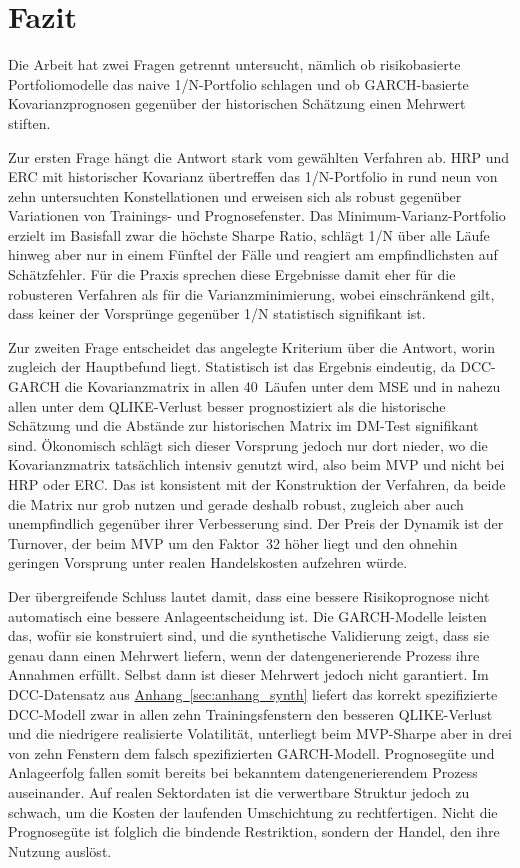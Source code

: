\documentclass[a4paper, 12pt]{article}
\begin{document}
\section{Fazit}\label{sec:fazit}
Die Arbeit hat zwei Fragen getrennt untersucht, nämlich ob risikobasierte Portfoliomodelle das naive 1/N-Portfolio schlagen und ob GARCH-basierte Kovarianzprognosen gegenüber der historischen Schätzung einen Mehrwert stiften.

Zur ersten Frage hängt die Antwort stark vom gewählten Verfahren ab.
HRP und ERC mit historischer Kovarianz übertreffen das 1/N-Portfolio in rund neun von zehn untersuchten Konstellationen und erweisen sich als robust gegenüber Variationen von Trainings- und Prognosefenster.
Das Minimum-Varianz-Portfolio erzielt im Basisfall zwar die höchste Sharpe Ratio, schlägt 1/N über alle Läufe hinweg aber nur in einem Fünftel der Fälle und reagiert am empfindlichsten auf Schätzfehler.
Für die Praxis sprechen diese Ergebnisse damit eher für die robusteren Verfahren als für die Varianzminimierung, wobei einschränkend gilt, dass keiner der Vorsprünge gegenüber 1/N statistisch signifikant ist.

Zur zweiten Frage entscheidet das angelegte Kriterium über die Antwort, worin zugleich der Hauptbefund liegt.
Statistisch ist das Ergebnis eindeutig, da DCC-GARCH die Kovarianzmatrix in allen 40~Läufen unter dem MSE und in nahezu allen unter dem QLIKE-Verlust besser prognostiziert als die historische Schätzung und die Abstände zur historischen Matrix im DM-Test signifikant sind.
Ökonomisch schlägt sich dieser Vorsprung jedoch nur dort nieder, wo die Kovarianzmatrix tatsächlich intensiv genutzt wird, also beim MVP und nicht bei HRP oder ERC.
Das ist konsistent mit der Konstruktion der Verfahren, da beide die Matrix nur grob nutzen und gerade deshalb robust, zugleich aber auch unempfindlich gegenüber ihrer Verbesserung sind.
Der Preis der Dynamik ist der Turnover, der beim MVP um den Faktor~32 höher liegt und den ohnehin geringen Vorsprung unter realen Handelskosten aufzehren würde.

Der übergreifende Schluss lautet damit, dass eine bessere Risikoprognose nicht automatisch eine bessere Anlageentscheidung ist.
Die GARCH-Modelle leisten das, wofür sie konstruiert sind, und die synthetische Validierung zeigt, dass sie genau dann einen Mehrwert liefern, wenn der datengenerierende Prozess ihre Annahmen erfüllt.
Selbst dann ist dieser Mehrwert jedoch nicht garantiert.
Im DCC-Datensatz aus \hyperref[sec:anhang_synth]{Anhang~\ref*{sec:anhang_synth}} liefert das korrekt spezifizierte DCC-Modell zwar in allen zehn Trainingsfenstern den besseren QLIKE-Verlust und die niedrigere realisierte Volatilität, unterliegt beim MVP-Sharpe aber in drei von zehn Fenstern dem falsch spezifizierten GARCH-Modell.
Prognosegüte und Anlageerfolg fallen somit bereits bei bekanntem datengenerierendem Prozess auseinander.
Auf realen Sektordaten ist die verwertbare Struktur jedoch zu schwach, um die Kosten der laufenden Umschichtung zu rechtfertigen.
Nicht die Prognosegüte ist folglich die bindende Restriktion, sondern der Handel, den ihre Nutzung auslöst.


\newpage

\end{document}
